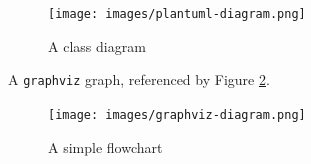 \documentclass[a4paper, 11pt]{article}
\begin{document}
    \begin{figure}[H]
        \centering
        \texttt{[image: images/plantuml-diagram.png]}
        \caption{A class diagram}
        \label{fig:plantuml-diagram}
    \end{figure}

    A \texttt{graphviz} graph, referenced by Figure
    \ref{fig:graphviz-diagram}.

    \begin{figure}[H]
        \centering
        \texttt{[image: images/graphviz-diagram.png]}
        \caption{A simple flowchart}
        \label{fig:graphviz-diagram}
    \end{figure}


    \clearpage
    
    
    
    \clearpage
    \printglossary[type=\acronymtype]
    \clearpage
    \printglossary
\end{document}
